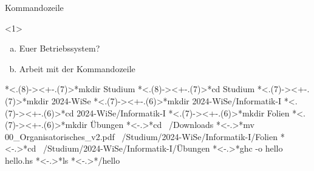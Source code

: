 \begin{frame}[fragile]{Kommandozeile}
    \begin{onlyenv}<1> %
    \begin{exercise}
        \begin{enumerate}[a)]
            \item Euer Betriebssystem?
            \item Arbeit mit der Kommandozeile
        \end{enumerate}
    \end{exercise}
    \end{onlyenv}
    \pause[]
    \begin{solve}
        \begin{plainbash}
*\only<.(8)->{\vspace{-\baselineskip}}\onslide<+-.(7)>*mkdir Studium
*\only<.(8)->{\vspace{-\baselineskip}}\onslide<+-.(7)>*cd Studium
*\only<.(7)->{\vspace{-\baselineskip}}\onslide<+-.(7)>*mkdir 2024-WiSe
*\only<.(7)->{\vspace{-\baselineskip}}\onslide<+-.(6)>*mkdir 2024-WiSe/Informatik-I
*\only<.(7)->{\vspace{-\baselineskip}}\onslide<+-.(6)>*cd 2024-WiSe/Informatik-I
*\only<.(7)->{\vspace{-\baselineskip}}\onslide<+-.(6)>*mkdir Folien
*\only<.(7)->{\vspace{-\baselineskip}}\onslide<+-.(6)>*mkdir Übungen
*\only<-.>{\vspace{-\baselineskip}}\onslide<+->*cd ~/Downloads
*\only<-.>{\vspace{-2\baselineskip}}\onslide<+->*mv 00_Organisatorisches_v2.pdf ~/Studium/2024-WiSe/Informatik-I/Folien
*\only<-.>{\vspace{-\baselineskip}}\onslide<+->*cd ~/Studium/2024-WiSe/Informatik-I/Übungen
*\only<-.>{\vspace{-\baselineskip}}\onslide<+->*ghc -o hello hello.hs
*\only<-.>{\vspace{-\baselineskip}}\onslide<+->*ls
*\only<-.>{\vspace{-\baselineskip}}\onslide<+->*/hello
        \end{plainbash}
    \end{solve}
\end{frame}